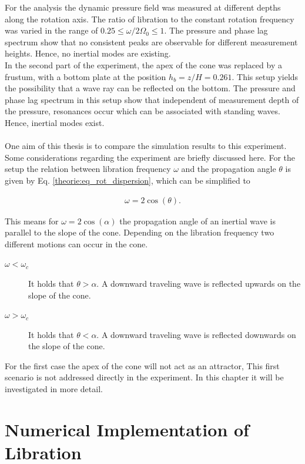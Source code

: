 For the analysis the dynamic pressure field was measured at different depths along the rotation axis.
The ratio of libration to the constant rotation frequency was varied in the range of ${0.25\leq\omega/2\Omega_0\leq1}$.
The pressure and phase lag spectrum  show that no consistent peaks are observable for different measurement heights.
Hence, no inertial modes are existing.
\\
In the second part of the experiment, the apex of the cone was replaced by a frustum,
with a bottom plate at the position $h_b=z/H = 0.261$.
This setup yields the possibility that a wave ray can be reflected on the bottom.
The pressure and phase lag spectrum in this setup show that
independent of measurement depth of the pressure, resonances occur which can be associated with standing waves.
Hence, inertial modes exist.
\\
\\
One aim of this thesis is to compare the simulation results to this experiment.
Some considerations regarding the experiment are briefly discussed here.
For the setup the relation between libration frequency $\omega$ and the propagation angle $\theta$
is given by Eq. \ref{theorie:eq_rot_dispersion}, which can be simplified to

\begin{align}
    \omega = 2\cos(\theta).
\end{align}

This means for $\omega = 2\cos(\alpha)$ the propagation angle of an inertial wave is parallel to the slope of the cone.
Depending on the libration frequency two different motions can occur in the cone.

\begin{description}
    \item[$\omega < \omega_c$]{It holds that $\theta > \alpha$. A downward traveling wave is reflected upwards on the slope of the cone.}
    \item[$\omega > \omega_c$]{It holds that $\theta < \alpha$. A downward traveling wave is reflected downwards on the slope of the cone.}
\end{description}

For the first case the apex of the cone will not act as an attractor,
This first scenario is not addressed directly in the experiment. In this chapter it will be investigated in more detail.

\section{Numerical Implementation of Libration}

